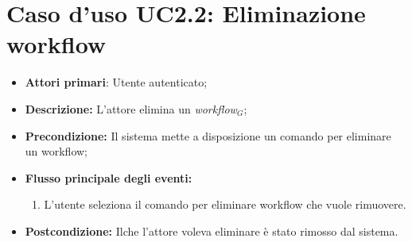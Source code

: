 \section{Caso d'uso UC2.2: Eliminazione workflow}
\begin{itemize}
	\item \textbf{Attori primari}: Utente autenticato;
	\item \textbf{Descrizione:} L'attore elimina un \textit{workflow$_{G}$};
	\item \textbf{Precondizione:} Il sistema mette a disposizione un comando per eliminare un workflow;
	\item \textbf{Flusso principale degli eventi:}
	\begin{enumerate}
		\item L'utente seleziona il comando per eliminare workflow che vuole rimuovere.
	\end{enumerate}
	\item \textbf{Postcondizione:} Ilche l'attore voleva eliminare è stato rimosso dal sistema.
\end{itemize}
